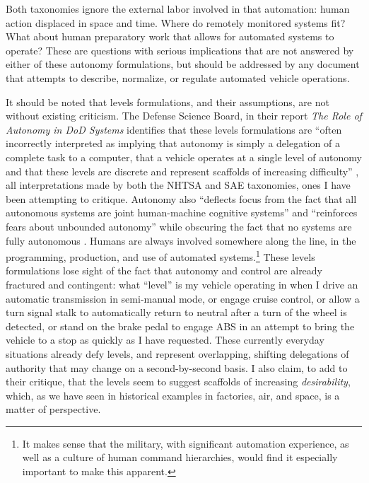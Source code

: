 
Both
taxonomies ignore the external labor involved in that automation:
human action displaced in space and time. Where do remotely monitored
systems fit? What about human preparatory work that allows for
automated systems to operate? These are questions with serious
implications that are not
answered by either of these autonomy formulations, but should be
addressed by any document that attempts to describe, normalize, or
regulate automated vehicle operations. 

It should be noted that levels formulations, and their assumptions, are not without
existing criticism. The Defense Science Board, in their report
\emph{The Role of 
Autonomy in DoD Systems} identifies that these levels formulations are
``often incorrectly 
interpreted as implying that autonomy is simply a delegation of a
complete task to a computer, that a vehicle operates at a single level
of autonomy and that these levels are discrete and represent scaffolds
of increasing difficulty'' \cite[p. 23-24]{DSB}, all interpretations
made by both the 
NHTSA and SAE taxonomies, ones I have been
attempting to critique. Autonomy also ``deflects focus from the fact that all
autonomous systems are joint human-machine cognitive systems'' and
``reinforces fears about unbounded autonomy'' while obscuring
the fact that no systems are fully autonomous \cite[p. 24]{DSB}. Humans are always
involved somewhere along the line, in the programming, production,
and use of automated systems.\footnote{It makes sense that the
  military, with significant automation experience, as well as
a culture of
human command hierarchies, would find it especially important to make
this apparent.} These levels
formulations lose sight of the fact that autonomy and control are
already fractured and contingent:  what ``level'' is my vehicle
operating in when I drive an automatic transmission in semi-manual
mode, or engage cruise control, or allow a turn signal stalk to
automatically return to neutral after a turn of the wheel is detected,
or stand on the brake pedal to engage ABS in an attempt to bring the
vehicle to a stop as quickly as I have requested. These currently
everyday situations already defy levels, and represent overlapping, shifting
delegations of authority that may change on a second-by-second basis.
I also claim, to add to their critique, that the
levels seem to suggest scaffolds of increasing \emph{desirability},
which, as we have seen in historical examples in factories, air, and
space, is a matter of perspective. 


